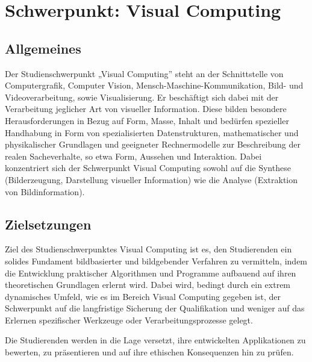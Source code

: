 \chapter{Schwerpunkt: Visual
Computing\label{/mi-2017/modulbeschreibungen-master/schwerpunkt-visual-computing}}\label{schwerpunkt-visual-computingpathlabelmi-2017modulbeschreibungen-masterschwerpunkt-visual-computing}

\section*{Allgemeines\label{/mi-2017/modulbeschreibungen-master/schwerpunkt-visual-computing}}\label{allgemeinespathlabelmi-2017modulbeschreibungen-masterschwerpunkt-visual-computing}

Der Studienschwerpunkt „Visual Computing'' steht an der Schnittstelle
von Computergrafik, Computer Vision, Mensch-Maschine-Kommunikation,
Bild- und Videoverarbeitung, sowie Visualisierung. Er beschäftigt sich
dabei mit der Verarbeitung jeglicher Art von visueller Information.
Diese bilden besondere Herausforderungen in Bezug auf Form, Masse,
Inhalt und bedürfen spezieller Handhabung in Form von spezialisierten
Datenstrukturen, mathematischer und physikalischer Grundlagen und
geeigneter Rechnermodelle zur Beschreibung der realen Sacheverhalte, so
etwa Form, Aussehen und Interaktion. Dabei konzentriert sich der
Schwerpunkt Visual Computing sowohl auf die Synthese (Bilderzeugung,
Darstellung visueller Information) wie die Analyse (Extraktion von
Bildinformation).

\section*{Zielsetzungen\label{/mi-2017/modulbeschreibungen-master/schwerpunkt-visual-computing}}\label{zielsetzungenpathlabelmi-2017modulbeschreibungen-masterschwerpunkt-visual-computing}

Ziel des Studienschwerpunktes Visual Computing ist es, den Studierenden
ein solides Fundament bildbasierter und bildgebender Verfahren zu
vermitteln, indem die Entwicklung praktischer Algorithmen und Programme
aufbauend auf ihren theoretischen Grundlagen erlernt wird. Dabei wird,
bedingt durch ein extrem dynamisches Umfeld, wie es im Bereich Visual
Computing gegeben ist, der Schwerpunkt auf die langfristige Sicherung
der Qualifikation und weniger auf das Erlernen spezifischer Werkzeuge
oder Verarbeitungsprozesse gelegt.

Die Studierenden werden in die Lage versetzt, ihre entwickelten
Applikationen zu bewerten, zu präsentieren und auf ihre ethischen
Konsequenzen hin zu prüfen.

